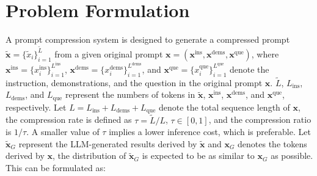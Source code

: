 \section{Problem Formulation}



A prompt compression system is designed to generate a compressed prompt $\widetilde{\bm{x}} = \{\widetilde{x}_i\}_{i=1}^{\widetilde{L}}$ from a given original prompt $\bm{x} = (\bm{x}^{\text{ins}}, \bm{x}^{\text{dems}}, \bm{x}^{\text{que}})$,
where $\bm{x}^{\text{ins}} = \{x_i^{\text{ins}}\}_{i=1}^{L
^{\text{ins}}}$, $\bm{x}^{\text{dems}} = \{x_i^{\text{dems}}\}_{i=1}^{L
^{\text{dems}}}$, and $\bm{x}^{\text{que}} = \{x_i^{\text{que}}\}_{i=1}^{L
^{\text{que}}}$ denote the instruction, demonstrations, and the question in the original prompt $\bm{x}$.
$\widetilde{L}$, $L_{\text{ins}}$, $L_{\text{dems}}$, and $L_{\text{que}}$ represent the numbers of tokens in $\widetilde{\bm{x}}$, $\bm{x}^{\text{ins}}$, $\bm{x}^{\text{dems}}$, and $\bm{x}^{\text{que}}$, respectively.
Let $L = L_{\text{ins}} + L_{\text{dems}} + L_{\text{que}}$ denote the total sequence length of $\bm{x}$, the compression rate is defined as $\tau = \widetilde{L} / L$, $\tau \in [0, 1]$, and the compression ratio is $1/\tau$.
A smaller value of $\tau$ implies a lower inference cost, which is preferable.
Let $\bm{\widetilde{x}}_G$ represent the LLM-generated results derived by $\widetilde{\bm{x}}$ and $\bm{x}_G$ denotes the tokens derived by $\bm{x}$,
the distribution of $\bm{\widetilde{x}}_G$ is expected to be as similar to $\bm{x}_G$ as possible.
This can be formulated as:

